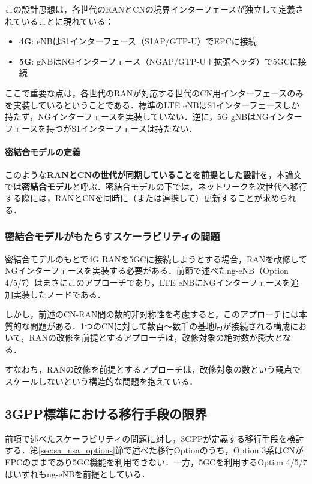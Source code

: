 この設計思想は，各世代のRANとCNの境界インターフェースが独立して定義されていることに現れている：
\begin{itemize}
  \item \textbf{4G}: eNBはS1インターフェース（S1AP/GTP-U）でEPCに接続
  \item \textbf{5G}: gNBはNGインターフェース（NGAP/GTP-U＋拡張ヘッダ）で5GCに接続
\end{itemize}

ここで重要な点は，各世代のRANが対応する世代のCN用インターフェースのみを実装しているということである．標準のLTE eNBはS1インターフェースしか持たず，NGインターフェースを実装していない．逆に，5G gNBはNGインターフェースを持つがS1インターフェースは持たない．

\paragraph{密結合モデルの定義}
このような\textbf{RANとCNの世代が同期していることを前提とした設計}を，本論文では\textbf{密結合モデル}と呼ぶ．密結合モデルの下では，ネットワークを次世代へ移行する際には，RANとCNを同時に（または連携して）更新することが求められる．

\subsubsection{密結合モデルがもたらすスケーラビリティの問題}
密結合モデルのもとで4G RANを5GCに接続しようとする場合，RANを改修してNGインターフェースを実装する必要がある．前節で述べたng-eNB（Option 4/5/7）はまさにこのアプローチであり，LTE eNBにNGインターフェースを追加実装したノードである．

しかし，前述のCN-RAN間の数的非対称性を考慮すると，このアプローチには本質的な問題がある．1つのCNに対して数百〜数千の基地局が接続される構成において，RANの改修を前提とするアプローチは，改修対象の絶対数が膨大となる．

すなわち，RANの改修を前提とするアプローチは，改修対象の数という観点でスケールしないという構造的な問題を抱えている．

\subsection{3GPP標準における移行手段の限界}

前項で述べたスケーラビリティの問題に対し，3GPPが定義する移行手段を検討する．第\ref{sec:sa_nsa_options}節で述べた移行Optionのうち，Option 3系はCNがEPCのままであり5GC機能を利用できない．一方，5GCを利用するOption 4/5/7はいずれもng-eNBを前提としている．

